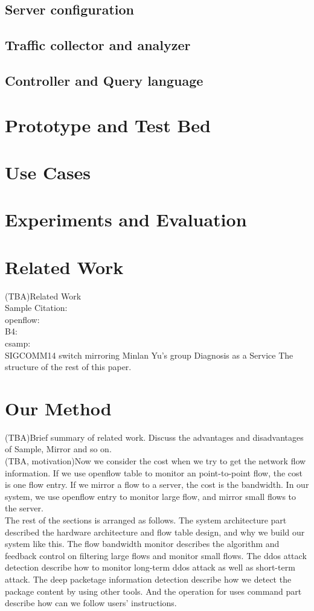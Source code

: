 \documentclass{acm_proc_article-sp}
\begin{document}
\subsection{Server configuration}
\subsection{Traffic collector and analyzer}
\subsection{Controller and Query language}

\section{Prototype and Test Bed}
\section{Use Cases}
\section{Experiments and Evaluation}


\section{Related Work}
(TBA)Related Work\\
Sample Citation:\\
openflow: \cite{openflow}\\
B4: \cite{google-b4}\\
csamp: \cite{csamp}\\
SIGCOMM14 switch mirroring Minlan Yu’s group
Diagnosis as a Service\cite{diagnosis}
The structure of the rest of this paper.

\section{Our Method}
(TBA)Brief summary of related work. Discuss the advantages and disadvantages of Sample, Mirror and so on.\\
(TBA, motivation)Now we consider the cost when we try to get the network flow information. If we use openflow table to monitor an point-to-point flow, the cost is one flow entry. If we mirror a flow to a server, the cost is the bandwidth. In our system, we use openflow entry to monitor large flow, and mirror small flows to the server.\\
The rest of the sections is arranged as follows. The system architecture part described the hardware architecture and flow table design, and why we build our system like this. The flow bandwidth monitor describes the algorithm and feedback control on filtering large flows and monitor small flows. The ddos attack detection describe how to monitor long-term ddos attack as well as short-term attack. The deep packetage information detection describe how we detect the package content by using other tools. And the operation for uses command part describe how can we follow users' instructions.\\
\end{document}
